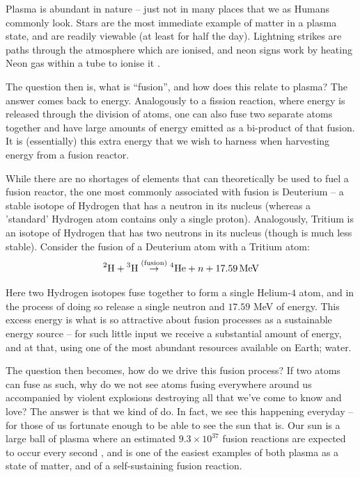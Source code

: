 Plasma is abundant in nature -- just not in many places that we as Humans commonly look. Stars are the most immediate example of matter in a plasma state, 
and are readily viewable (at least for half the day). Lightning strikes are paths through the atmosphere which are ionised, 
and neon signs work by heating Neon gas within a tube to ionise it \cite{plasma-lightning}.

The question then is, what is ``fusion'', and how does this relate to plasma? The answer comes back to energy. Analogously to a fission reaction, 
where energy is released through the division of atoms, one can also fuse two separate atoms together and have large amounts of energy emitted 
as a bi-product of that fusion. It is (essentially) this extra energy that we wish to harness when harvesting energy from a fusion reactor.

While there are no shortages of elements that can theoretically be used to fuel a fusion reactor, the one most commonly associated with fusion is Deuterium -- a stable isotope of Hydrogen that 
has a neutron in its nucleus (whereas a 'standard' Hydrogen atom contains only a single proton). Analogously, Tritium is an isotope of Hydrogen
that has two neutrons in its nucleus (though is much less stable). Consider the fusion of a Deuterium atom with a Tritium atom:
\[ \prescript{2}{}{\text{H}} + \prescript{3}{}{\text{H}} \stackrel{\text{(fusion)}}{\to} \prescript{4}{}{\text{He}} + n + 17.59 \, \text{MeV} \]

Here two Hydrogen isotopes fuse together to form a single Helium-$4$ atom, and in the process of doing so release 
a single neutron and $17.59$ MeV of energy. This excess energy is what is so attractive about fusion processes as a sustainable 
energy source -- for such little input we receive a substantial amount of energy, and at that, using one of the most abundant 
resources available on Earth; water.

The question then becomes, how do we drive this fusion process? If two atoms can fuse as such, why do we not 
see atoms fusing everywhere around us accompanied by violent explosions destroying all that we've 
come to know and love? The answer is that we kind of do. In fact, we see this happening everyday --
for those of us fortunate enough to be able to see the sun that is. Our sun 
is a large ball of plasma where an estimated $9.3 \times 10^{37}$ fusion reactions are expected to occur every second \cite{nasa-sun-fusion}, 
and is one of the easiest examples of both plasma as a state of matter, and of a self-sustaining fusion reaction.

